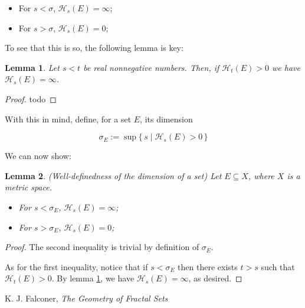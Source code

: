 \documentclass[11pt]{amsart}
\newcommand{\HH}{\mathcal{H}}
\newtheorem{lemma}{Lemma}
\begin{document}
\begin{itemize}
\item For $s < \sigma$, $\HH_s(E) = \infty$;

\item For $s > \sigma$, $\HH_s(E) = 0$;
\end{itemize}

To see that this is so, the following lemma is key:

\begin{lemma}\label{helperdimension}
Let $s < t$ be real nonnegative numbers. Then, if $\HH_t(E) > 0$ we have $\HH_s(E) = \infty$.
\end{lemma}

\begin{proof}
todo
\end{proof}

With this in mind, define, for a set $E$, its dimension

\[\sigma_E := \sup \{\, s \mid \HH_s(E) > 0 \,\}\]

We can now show:

\begin{lemma}
(Well-definedness of the dimension of a set) Let $E \subseteq X$, where $X$ is a metric space.

\begin{itemize}
\item For $s < \sigma_E$, $\HH_s(E) = \infty$;

\item For $s > \sigma_E$, $\HH_s(E) = 0$;
\end{itemize}

\end{lemma}

\begin{proof}
The second inequality is trivial by definition of $\sigma_E$.

As for the first inequality, notice that if $s < \sigma_E$ then there exists $t > s$ such that $\HH_t(E) > 0$. By lemma \ref{helperdimension}, we have $\HH_s(E) = \infty$, as desired.
\end{proof}


\begin{thebibliography}{1}
K. J. Falconer, \textit{The Geometry of Fractal Sets}

\end{thebibliography}
\end{document}
